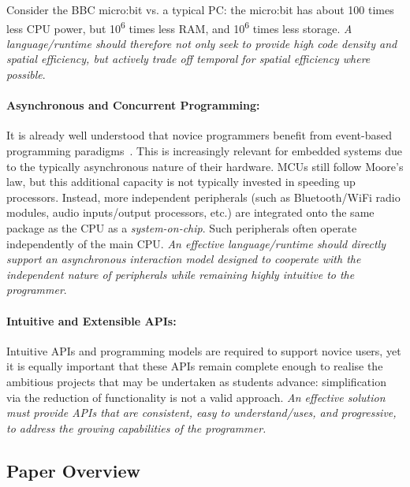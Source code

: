 Consider the BBC micro:bit vs. a typical PC: the micro:bit has about 100 times less CPU power, but 10\textsuperscript{6} times less RAM, and 10\textsuperscript{6} times less storage. \emph{A language/runtime should therefore not only seek to provide high code density and spatial efficiency, but actively trade off temporal for spatial efficiency where possible}.

\paragraph{Asynchronous and Concurrent Programming:}
It is already well understood that novice programmers benefit from event-based programming paradigms~\cite{maloney2008programming,maloney2010scratch,turbak2014events}. This is increasingly relevant for embedded systems due to the typically asynchronous nature of their hardware. MCUs still follow Moore's law, 
but this additional capacity is not typically invested in speeding
up processors. Instead, more independent peripherals (such as Bluetooth/WiFi radio modules, audio inputs/output processors, etc.) are integrated onto the same package as the CPU as a \emph{system-on-chip}. Such peripherals often operate independently of the main CPU. \emph{An effective language/runtime should directly support an asynchronous interaction model designed to cooperate with the independent nature of peripherals while remaining highly intuitive to the programmer}.

\paragraph{Intuitive and Extensible APIs:}
Intuitive APIs and programming models are required to support novice users, yet it is equally important that these APIs remain complete enough to realise the ambitious projects that may be undertaken as students advance: simplification via the reduction of functionality is not a valid approach. 
\emph{An effective solution must provide APIs that are consistent, easy to understand/uses, and progressive, to address the growing capabilities of the programmer.}

\subsection{Paper Overview}

